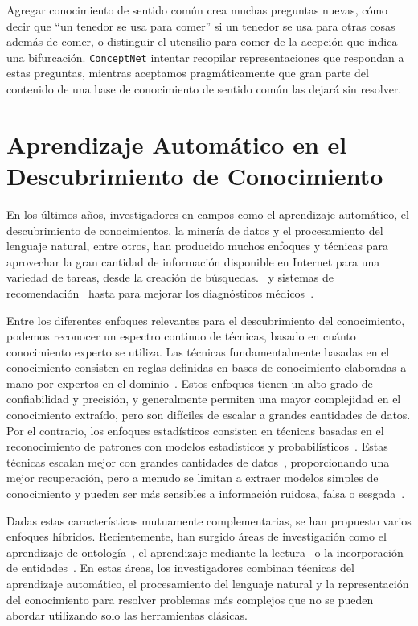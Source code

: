Agregar conocimiento de sentido común crea muchas preguntas nuevas, cómo decir que “un tenedor se usa para comer” si un tenedor se usa para otras cosas además de comer, o distinguir el utensilio para comer de la acepción que indica una bifurcación.
\texttt{ConceptNet} intentar recopilar representaciones que respondan a estas preguntas, mientras aceptamos pragmáticamente que gran parte del contenido de una base de conocimiento de sentido común las dejará sin resolver.

\section{Aprendizaje Automático en el Descubrimiento de Conocimiento}\label{sec:sota-ml}

En los últimos años, investigadores en campos como el aprendizaje automático, el descubrimiento de conocimientos, la minería de datos y el procesamiento del lenguaje natural, entre otros, han producido muchos enfoques y técnicas para aprovechar la gran cantidad de información disponible en Internet para una variedad de tareas, desde la creación de búsquedas.~\cite{google} y sistemas de recomendación~\cite{youtube} hasta para mejorar los diagnósticos médicos~\cite{watson}.

Entre los diferentes enfoques relevantes para el descubrimiento del conocimiento, podemos reconocer un espectro continuo de técnicas, basado en cuánto conocimiento experto se utiliza.
Las técnicas fundamentalmente basadas en el conocimiento consisten en reglas definidas en bases de conocimiento elaboradas a mano por expertos en el dominio~\cite{chandrasekaran1986generic}.
Estos enfoques tienen un alto grado de confiabilidad y precisión, y generalmente permiten una mayor complejidad en el conocimiento extraído, pero son difíciles de escalar a grandes cantidades de datos.
Por el contrario, los enfoques estadísticos consisten en técnicas basadas en el reconocimiento de patrones con modelos estadísticos y probabilísticos~\cite{kevin2012machine}.
Estas técnicas escalan mejor con grandes cantidades de datos~\cite{le2013building}, proporcionando una mejor recuperación, pero a menudo se limitan a extraer modelos simples de conocimiento y pueden ser más sensibles a información ruidosa, falsa o sesgada~\cite{bolukbasi2016man}.

Dadas estas características mutuamente complementarias, se han propuesto varios enfoques híbridos.
Recientemente, han surgido áreas de investigación como el aprendizaje de ontología~\cite{cimiano2009ontology}, el aprendizaje mediante la lectura~\cite{barker2007learning} o la incorporación de entidades~\cite{hu2015entity}.
En estas áreas, los investigadores combinan técnicas del aprendizaje automático, el procesamiento del lenguaje natural y la representación del conocimiento para resolver problemas más complejos que no se pueden abordar utilizando solo las herramientas clásicas.

